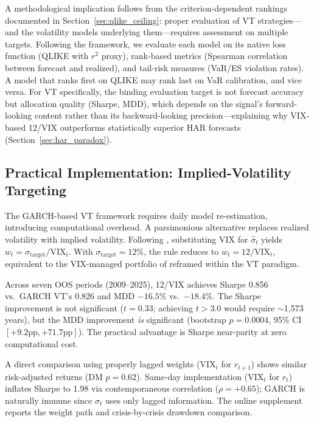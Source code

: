 A methodological implication follows from the criterion-dependent rankings documented in Section~\ref{sec:qlike_ceiling}: proper evaluation of VT strategies---and the volatility models underlying them---requires assessment on multiple targets. Following the \citet{patton2011} framework, we evaluate each model on its native loss function (QLIKE with $r^2$ proxy), rank-based metrics (Spearman correlation between forecast and realized), and tail-risk measures (VaR/ES violation rates). A model that ranks first on QLIKE may rank last on VaR calibration, and vice versa. For VT specifically, the binding evaluation target is not forecast accuracy but allocation quality (Sharpe, MDD), which depends on the signal's forward-looking content rather than its backward-looking precision---explaining why VIX-based 12/VIX outperforms statistically superior HAR forecasts (Section~\ref{sec:har_paradox}).

\subsection{Practical Implementation: Implied-Volatility Targeting}
\label{sec:ivt}

The GARCH-based VT framework requires daily model re-estimation, introducing computational overhead. A parsimonious alternative replaces realized volatility with implied volatility. Following \citet{moreira2017}, substituting VIX for $\hat{\sigma}_t$ yields $w_t = \sigma_{\text{target}} / \text{VIX}_t$. With $\sigma_{\text{target}} = 12\%$, the rule reduces to $w_t = 12 / \text{VIX}_t$, equivalent to the VIX-managed portfolio of \citet{bozovic2024} reframed within the VT paradigm.

Across seven OOS periods (2009--2025), 12/VIX achieves Sharpe 0.856 vs.\ GARCH VT's 0.826 and MDD $-16.5\%$ vs.\ $-18.4\%$. The Sharpe improvement is not significant ($t = 0.33$; achieving $t > 3.0$ would require $\sim$1,573 years), but the MDD improvement \textit{is} significant (bootstrap $p = 0.0004$, 95\% CI $[+9.2\text{pp}, +71.7\text{pp}]$). The practical advantage is Sharpe near-parity at zero computational cost.

A direct comparison using properly lagged weights ($\text{VIX}_t$ for $r_{t+1}$) shows similar risk-adjusted returns (DM $p = 0.62$). Same-day implementation ($\text{VIX}_t$ for $r_t$) inflates Sharpe to 1.98 via contemporaneous correlation ($\rho = +0.65$); GARCH is naturally immune since $\sigma_t$ uses only lagged information. The online supplement reports the weight path and crisis-by-crisis drawdown comparison.


